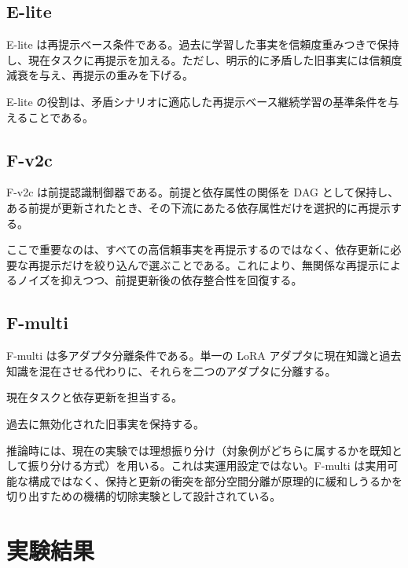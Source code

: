 \documentclass[12pt,a4paper]{article}
\begin{document}
\subsection{E-lite}\label{e-lite}

E-lite は再提示ベース条件である。過去に学習した事実を信頼度重みつきで保持し、現在タスクに再提示を加える。ただし、明示的に矛盾した旧事実には信頼度減衰を与え、再提示の重みを下げる。

E-lite の役割は、矛盾シナリオに適応した再提示ベース継続学習の基準条件を与えることである。

\subsection{F-v2c}\label{f-v2c}

F-v2c は前提認識制御器である。前提と依存属性の関係を DAG として保持し、ある前提が更新されたとき、その下流にあたる依存属性だけを選択的に再提示する。

ここで重要なのは、すべての高信頼事実を再提示するのではなく、依存更新に必要な再提示だけを絞り込んで選ぶことである。これにより、無関係な再提示によるノイズを抑えつつ、前提更新後の依存整合性を回復する。

\subsection{F-multi}\label{f-multi}

F-multi は多アダプタ分離条件である。単一の LoRA アダプタに現在知識と過去知識を混在させる代わりに、それらを二つのアダプタに分離する。

\begin{definition}[現在アダプタ]
現在タスクと依存更新を担当する。
\end{definition}

\begin{definition}[保持アダプタ]
過去に無効化された旧事実を保持する。
\end{definition}

推論時には、現在の実験では理想振り分け（対象例がどちらに属するかを既知として振り分ける方式）を用いる。これは実運用設定ではない。F-multi は実用可能な構成ではなく、保持と更新の衝突を部分空間分離が原理的に緩和しうるかを切り出すための機構的切除実験として設計されている。

\section{実験結果}\label{ux5b9fux9a13ux7d50ux679c}
\end{document}
